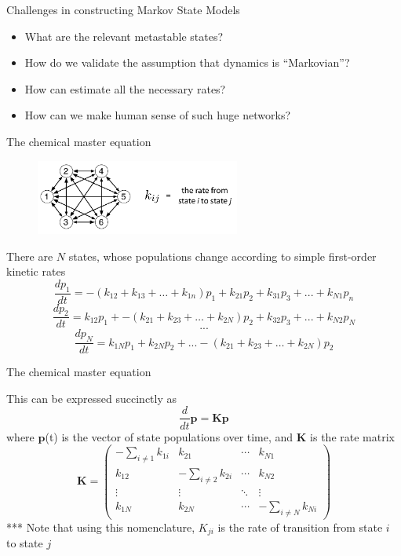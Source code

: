 \documentclass{beamer}
\begin{document}
\begin{frame}{Challenges in constructing Markov State Models}

\begin{itemize}
  \item What are the relevant metastable states?
  \item How do we validate the assumption that dynamics is ``Markovian''?
  \item How can estimate all the necessary rates?
  \item How can we make human sense of such huge networks?
\end{itemize}

\end{frame}

\begin{frame}{The chemical master equation}

\begin{figure}
\includegraphics[width=0.6\textwidth]{n-state-kinetics}
\end{figure}

There are $N$ states, whose populations change according to simple first-order kinetic rates
$$\frac{dp_1}{dt} = -(k_{12}+k_{13}+…+k_{1n})p_1 + k_{21} p_2 +k_{31} p_3 + ... +  k_{N1} p_n $$
$$\frac{dp_2}{dt} = k_{12} p_1 + -(k_{21}+k_{23}+…+k_{2N})p_2 + k_{32} p_3 + ... +  k_{N2} p_N $$
$$ ... $$
$$\frac{dp_N}{dt} = k_{1N} p_1 + k_{2N} p_2 + ...   -(k_{21}+k_{23}+…+k_{2N})p_2$$


\end{frame}


\begin{frame}{The chemical master equation}

This can be expressed succinctly as 
$$\frac{d}{dt} \mathbf{p} = \mathbf{K} \mathbf{p}$$
where $\mathbf{p}$(t) is the vector of state populations over time, and $\mathbf{K}$ is the rate matrix
$$\mathbf{K} =
 \begin{pmatrix}
  -\sum_{i \neq 1} k_{1i} & k_{21} & \cdots & k_{N1} \\
  k_{12} & -\sum_{i \neq 2}k_{2i} & \cdots & k_{N2} \\
  \vdots  & \vdots  & \ddots & \vdots  \\
  k_{1N} & k_{2N} & \cdots & -\sum_{i \neq N}k_{Ni}
 \end{pmatrix}
$$
*** Note that using this nomenclature, $K_{ji}$ is the rate of transition from state $i$ to state $j$

\end{frame}
\end{document}

